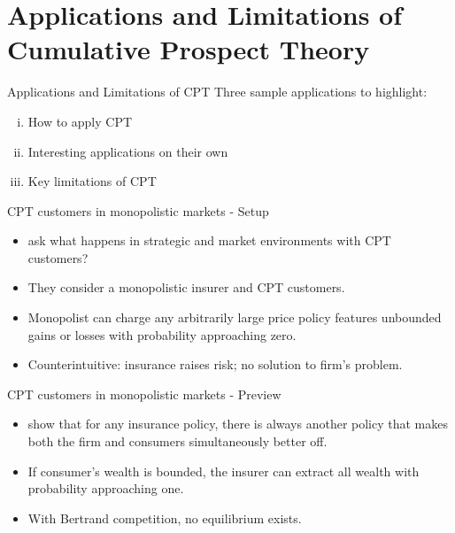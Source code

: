 \documentclass[11pt, aspectratio=169]{beamer}
\begin{document}
\section{Applications and Limitations of Cumulative Prospect Theory}



\begin{frame}{Applications and Limitations of CPT}
    Three sample applications to highlight:\bigskip
        \begin{enumerate}[i)]
            \item How to apply CPT\bigskip
            \item Interesting applications on their own\bigskip
            \item Key limitations of CPT\bigskip
        \end{enumerate}
      
    \end{frame}
    
    
    \begin{frame}{CPT customers in monopolistic markets - Setup}
        \begin{itemize}
            \item \citet{AzevedoGottlieb2012} ask what happens in strategic and market environments with CPT customers?\bigskip
            \item They consider a monopolistic insurer and CPT customers.\bigskip
                \item Monopolist can charge any arbitrarily large price policy features unbounded gains or losses with probability approaching zero.\bigskip
                \item Counterintuitive: insurance raises risk; no solution to firm's problem.\medskip           
        \end{itemize}
    \end{frame}
    
    \begin{frame}{CPT customers in monopolistic markets - Preview}
        \begin{itemize}
            \item \citet{AzevedoGottlieb2012} show that for any insurance policy, there is always another policy that makes both the firm and consumers simultaneously better off.\bigskip
            \item If consumer's wealth is bounded, the insurer can extract all wealth with probability approaching one.\bigskip
            \item With Bertrand competition, no equilibrium exists.\bigskip
        \end{itemize}
    \end{frame}
    
\end{document}
